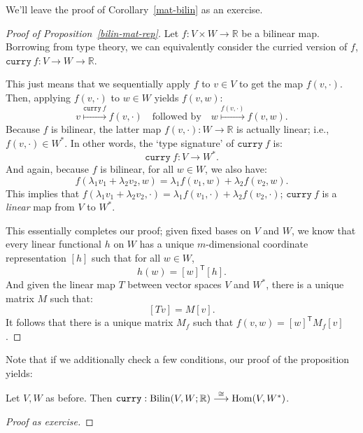 We'll leave the proof of Corollary~\ref{mat-bilin} as an exercise. 
\begin{proof}[Proof of Proposition~\ref{bilin-mat-rep}]
  Let $f : V \times W \to \mathbb{R}$ be a bilinear map. Borrowing
  from type theory, we can equivalently consider the curried version
  of $f$, $\texttt{curry}\ f : V \to W \to \mathbb{R}$. 

  This just means that we sequentially apply $f$ to $v \in V$ to get
  the map $f(v,\cdot)$. Then, applying $f(v,\cdot)$ to $w \in W$
  yields $f(v,w)$: 
  \[v \overset{\texttt{curry}\ f}{\longmapsto} f(v, \cdot) \quad
  \textrm{followed by} \quad w \overset{f(v,\cdot)}{\longmapsto}
  f(v,w).\] 
  Because $f$ is bilinear, the latter map $f(v, \cdot) : W \to
  \mathbb{R}$ is actually linear; i.e., $f(v,\cdot) \in W^*$. In other
  words, the `type signature' of $\texttt{curry}\ f$ is: 
  \[\texttt{curry}\ f : V \to W^*.\]
  And again, because $f$ is bilinear, for all $w \in W$, we also have:
  \[f(\lambda_1 v_1 + \lambda_2 v_2, w) = \lambda_1 f(v_1, w) +
  \lambda_2 f(v_2, w).\] 
  This implies that $f(\lambda_1 v_1 + \lambda_2 v_2 , \cdot) =
  \lambda_1 f(v_1, \cdot) + \lambda_2 f(v_2,\cdot)$;
  $\texttt{curry}\ f$ is a \emph{linear} map from $V$ to $W^*$. 

  This essentially completes our proof; given fixed bases on $V$ and
  $W$, we know that every linear functional $h$ on $W$ has a unique
  $m$-dimensional coordinate representation $[h]$ such that for all $w
  \in W$, 
  \[h(w) = [w]^\mathsf{T}[h].\]
  And given the linear map $T$ between vector spaces $V$ and $W^*$,
  there is a unique matrix $M$ such that: 
  \[[Tv] = M [v].\]
  It follows that there is a unique matrix $M_f$ such that $f(v,w) =
  [w]^\mathsf{T} M_f [v]$. 
\end{proof}

Note that if we additionally check a few conditions, our proof of the
proposition yields: 
\begin{corollary}
  Let $V, W$ as before. Then $\textup{\texttt{curry}} :
  \mathrm{Bilin}(V, W;\mathbb{R}) \overset{\cong}{\longrightarrow}
  \mathrm{Hom}(V, W^*)$. 
\end{corollary}
\begin{proof}[Proof as exercise]
\end{proof}

